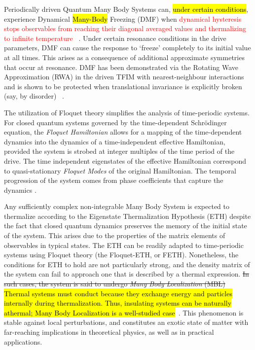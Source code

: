 \documentclass[%
reprint,
superscriptaddress,
linenumbers,
amsmath,amssymb,
aps,
prb,
showkeys,
]{revtex4-2}
\begin{document}
	Periodically driven Quantum Many Body Systems can, \hl{under certain conditions}, experience Dynamical \hl{Many-Body} Freezing (DMF) when \textcolor{red}{dynamical hysteresis stops observables from reaching their diagonal averaged values and thermalizing to infinite temperature} ~\cite{bordia_periodically_2017, sahoo_periodically_2019, das_exotic_2010}. Under certain resonance conditions in the drive parameters, DMF can cause the response to ‘freeze’ completely to its initial value at all times. This arises as a consequence of additional approximate symmetries that occur at resonance. DMF has been demonstrated via the Rotating Wave Approximation (RWA) in the driven TFIM with nearest-neighbour interactions ~\cite{mbeng_quantum_2020} and is shown to be protected when translational invariance is explicitly broken (say, by disorder) ~\cite{yamada_localization_2022, roy_fate_2015}. 

	The utilization of Floquet theory simplifies the analysis of time-periodic systems. For closed quantum systems governed by the time-dependent Schr\"odinger equation, the \textit{Floquet Hamiltonian} allows for a mapping 
of the time-dependent dynamics into the dynamics of 	
a time-independent effective Hamiltonian, provided the system is strobed at integer multiples of the time period of the drive. The time independent eigenstates of the effective Hamiltonian correspond to quasi-stationary \textit{Floquet Modes} of the original Hamiltonian. The temporal progression of the system comes from  phase coefficients that capture the dynamics \cite{li_floquet_2018,eckardt_high_frequency_2015}.	
	
	Any sufficiently complex non-integrable Many Body System is expected to thermalize according to the Eigenstate Thermalization Hypothesis (ETH) despite the fact that closed quantum dynamics preserves the memory of the initial state of the system. This arises due to the properties of the matrix elements of observables 
	in typical states\cite{zhang_floquet_2016}. The ETH can be readily adapted to time-periodic systems using Floquet theory (the Floquet-ETH, or FETH). Nonetheless, the conditions for ETH to hold are not particularly strong, and the density matrix of the system can fail to approach one that is described by a thermal expression. \st{In such cases, the system is said to undergo \textit{Many Body Localization} (MBL)} \hl{Thermal systems must conduct because they exchange energy and particles internally during thermalization. Thus, insulating systems can be naturally athermal;  Many Body Localization is a well-studied case}~\cite{khemani_phase_2016}. This phenomenon is stable against local perturbations, and constitutes an exotic state of matter with far-reaching implications in theoretical physics, as well as in practical applications\cite{yunger_halpern_quantum_2019}.
	
\end{document}
